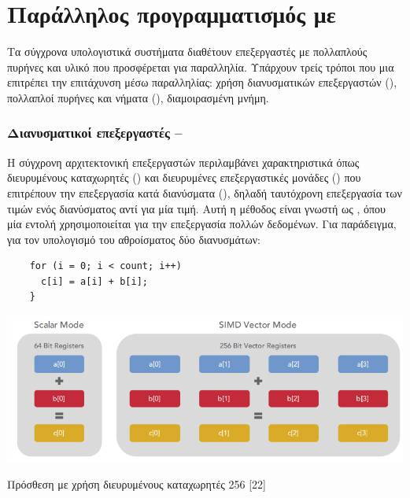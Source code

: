 \section{Παράλληλος προγραμματισμός με }
Τα σύγχρονα υπολογιστικά συστήματα διαθέτουν επεξεργαστές  με πολλαπλούς πυρήνες και υλικό που προσφέρεται για παραλληλία. Υπάρχουν τρείς τρόποι που μια  επιτρέπει την επιτάχυνση μέσω παραλληλίας: χρήση διανυσματικών επεξεργαστών (), πολλαπλοί πυρήνες και νήματα (), διαμοιρασμένη μνήμη.

\subsubsection{Διανυσματικοί επεξεργαστές – }

Η σύγχρονη αρχιτεκτονική επεξεργαστών περιλαμβάνει χαρακτηριστικά όπως διευρυμένους καταχωρητές () και διευρυμένες επεξεργαστικές μονάδες () που επιτρέπουν την επεξεργασία κατά διανύσματα (), δηλαδή ταυτόχρονη επεξεργασία των τιμών ενός διανύσματος αντί για μία τιμή. Αυτή η μέθοδος είναι γνωστή ως , όπου μία εντολή χρησιμοποιείται για την επεξεργασία πολλών δεδομένων. Για παράδειγμα, για τον υπολογισμό του αθροίσματος δύο διανυσμάτων:

\begin{center}
\begin{minipage}{0.5\textwidth} 
\begin{verbatim}
    for (i = 0; i < count; i++) 
      c[i] = a[i] + b[i]; 
    }
\end{verbatim}
\end{minipage}
\end{center}

\begin{Illustration}[!h] 
	\centering
	\includegraphics[width=\textwidth]{images/image043.png} 
	\caption{Πρόσθεση με χρήση διευρυμένους καταχωρητές 256 [22]}
	\label{image-registers-add}
\end{Illustration}

